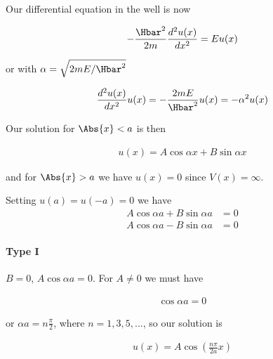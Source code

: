 {Our differential equation in the well is now

\begin{equation}\label{eqn:PHY356Lecture9:6}
\begin{aligned}
-\frac{\Hbar^2 }{2m} \frac{d^2 u(x)}{dx^2} = E u(x)
\end{aligned}
\end{equation}

or with \(\alpha = \sqrt{2m E/\Hbar^2}\)

\begin{equation}\label{eqn:PHY356Lecture9:7}
\begin{aligned}
\frac{d^2 u(x)}{dx^2} u(x) = -\frac{2 m E}{\Hbar^2} u(x) = - \alpha^2 u(x)
\end{aligned}
\end{equation}

Our solution for \(\Abs{x} < a\) is then

\begin{equation}\label{eqn:PHY356Lecture9:8}
\begin{aligned}
u(x) = A \cos \alpha x + B \sin\alpha x
\end{aligned}
\end{equation}

and for \(\Abs{x} > a\) we have \(u(x) = 0\) since \(V(x) = \infty\).

Setting \(u(a) = u(-a) = 0\) we have
\begin{equation}\label{eqn:lecture9boundStates:100}
\begin{aligned}
A \cos \alpha a + B \sin\alpha a &= 0 \\
A \cos \alpha a - B \sin\alpha a &= 0
\end{aligned}
\end{equation}


\paragraph{Type I}
\(B=0\), \(A \cos\alpha a = 0\).  For \(A \ne 0\) we must have

\begin{equation}\label{eqn:lecture9boundStates:120}
\begin{aligned}
\cos \alpha a = 0
\end{aligned}
\end{equation}

or \(\alpha a = n \frac{\pi}{2}\), where \(n = 1, 3, 5, ...\), so our solution is

\begin{equation}\label{eqn:PHY356Lecture9:9}
\begin{aligned}
u(x) = A \cos \left( \frac{n \pi}{2 a} x \right)
\end{aligned}
\end{equation}

}
